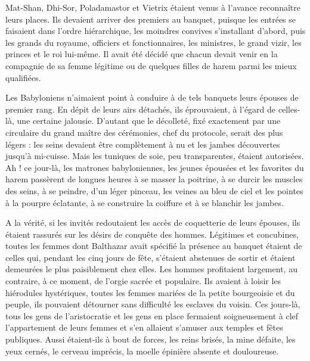 \documentclass[a4paper, 11pt, oneside, polutonikogreek, french]{article}
\begin{document}
Mat-Shan, Dhi-Sor, Poladamastor et Vietrix étaient venus à l'avance reconnaître leurs places. Ils devaient arriver des premiers au banquet, puisque les entrées se faisaient dans l'ordre hiérarchique, les moindres convives s'installant d'abord, puis les grands du royaume, officiers et fonctionnaires, les ministres, le grand vizir, les princes et le roi lui-même. Il avait été décidé que chacun devait venir en la compagnie de sa femme légitime ou de quelques filles de harem parmi les mieux qualifiées.

Les Babyloniens n'aimaient point à conduire à de tels banquets leurs épouses de premier rang. En dépit de leurs airs détachés, ils éprouvaient, à l'égard de celles-là, une certaine jalousie. D'autant que le décolleté, fixé exactement par une circulaire du grand maître des cérémonies, chef du protocole, serait des plus légers : les seins devaient être complètement à nu et les jambes découvertes jusqu'à mi-cuisse. Mais les tuniques de soie, peu transparentes, étaient autorisées. Ah ! ce jour-là, les matrones babyloniennes, les jeunes épousées et les favorites du harem passèrent de longues heures à se masser la poitrine, à se durcir les muscles des seins, à se peindre, d'un léger pinceau, les veines au bleu de ciel et les pointes à la pourpre éclatante, à se construire la coiffure et à se blanchir les jambes.

\bigskip
\centerline{\EightStarTaper}
\centerline{\EightStarTaper\EightStarTaper}
\bigskip

A la vérité, si les invités redoutaient les accès de coquetterie de leurs épouses, ils étaient rassurés sur les désirs de conquête des hommes. Légitimes et concubines, toutes les femmes dont Balthazar avait spécifié la présence au banquet étaient de celles qui, pendant les cinq jours de fête, s'étaient abstenues de sortir et étaient demeurées le plus paisiblement chez elles. Les hommes profitaient largement, au contraire, à ce moment, de l'orgie sacrée et populaire. Ils avaient à loisir les hiérodules hystériques, toutes les femmes mariées de la petite bourgeoisie et du peuple, ils pouvaient détourner sans difficulté les esclaves du voisin. Ces jours-là, tous les gens de l'aristocratie et les gens en place fermaient soigneusement à clef l'appartement de leurs femmes et s'en allaient s'amuser aux temples et fêtes publiques. Aussi étaient-ils à bout de forces, les reins brisés, la mine défaite, les yeux cernés, le cerveau imprécis, la moelle épinière absente et douloureuse.

\bigskip
\centerline{\EightStarTaper}
\centerline{\EightStarTaper\EightStarTaper}
\bigskip
\end{document}
